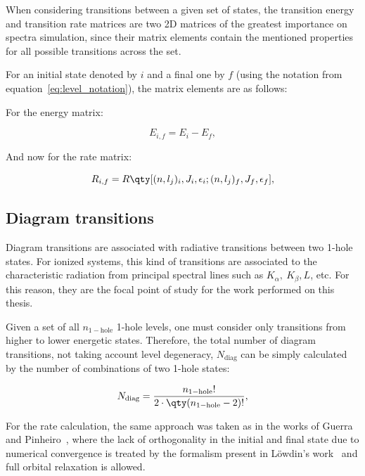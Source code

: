 When considering transitions between a given set of states, the transition energy and transition rate matrices are two 2D matrices of the greatest importance on spectra simulation, since their matrix elements contain the mentioned properties for all possible transitions across the set.

For an initial state denoted by $i$ and a final one by $f$ (using the notation from equation~\eqref{eq:level_notation}), the matrix elements are as follows:

For the energy matrix:

\begin{equation}
    E_{i,f} = E_i - E_f , 
\end{equation}

And now for the rate matrix:

\begin{equation}
    R_{i,f}=R\qty[(n,l_j)_i,J_i,\epsilon_i;(n,l_j)_f,J_f,\epsilon_f],
\end{equation}

\subsection{Diagram transitions}

Diagram transitions are associated with radiative transitions between two 1-hole states. For ionized systems, this kind of transitions are associated to the characteristic radiation from principal spectral lines such as $K_{\alpha},\ K_{\beta}, L$, etc. For this reason, they are the focal point of study for the work performed on this thesis.

Given a set of all $n_{1-\text{hole}}$ 1-hole levels, one must consider only transitions from higher to lower energetic states. Therefore, the total number of diagram transitions, not taking account level degeneracy, $N_{\text{diag}}$ can be simply calculated by the number of combinations of two 1-hole states:

\begin{equation}
    N_{\text{diag}} = \frac{n_{1-\text{hole}}!}{2\cdot\qty(n_{1-\text{hole}}-2)!},
\end{equation}



For the rate calculation, the same approach was taken as in the works of Guerra~\cite{Guerra2021} and Pinheiro~\cite{Pinheiro2023}, where the lack of orthogonality in the initial and final state due to numerical convergence is treated by the formalism present in Löwdin's work~\cite{Lowdin1955} and full orbital relaxation is allowed.

